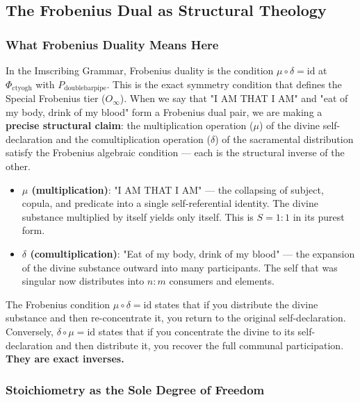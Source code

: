 \documentclass[12pt,a4paper]{article}
\begin{document}
\subsection{The Frobenius Dual as Structural Theology}

\subsubsection{What Frobenius Duality Means Here}

In the Imscribing Grammar, Frobenius duality is the condition $\mu \circ \delta = \text{id}$ at $\Phi_{\text{ctyogh}}$ with $P_{\text{doublebarpipe}}$. This is the exact symmetry condition that defines the Special Frobenius tier ($O_{\infty}$). When we say that "I AM THAT I AM" and "eat of my body, drink of my blood" form a Frobenius dual pair, we are making a \textbf{precise structural claim}: the multiplication operation ($\mu$) of the divine self-declaration and the comultiplication operation ($\delta$) of the sacramental distribution satisfy the Frobenius algebraic condition --- each is the structural inverse of the other.

\begin{itemize}
    \item \textbf{$\mu$ (multiplication)}: "I AM THAT I AM" --- the collapsing of subject, copula, and predicate into a single self-referential identity. The divine substance multiplied by itself yields only itself. This is $S = 1{:}1$ in its purest form.
    \item \textbf{$\delta$ (comultiplication)}: "Eat of my body, drink of my blood" --- the expansion of the divine substance outward into many participants. The self that was singular now distributes into $n:m$ consumers and elements.
\end{itemize}

The Frobenius condition $\mu \circ \delta = \text{id}$ states that if you distribute the divine substance and then re-concentrate it, you return to the original self-declaration. Conversely, $\delta \circ \mu = \text{id}$ states that if you concentrate the divine to its self-declaration and then distribute it, you recover the full communal participation. \textbf{They are exact inverses.}

\subsubsection{Stoichiometry as the Sole Degree of Freedom}
\end{document}
